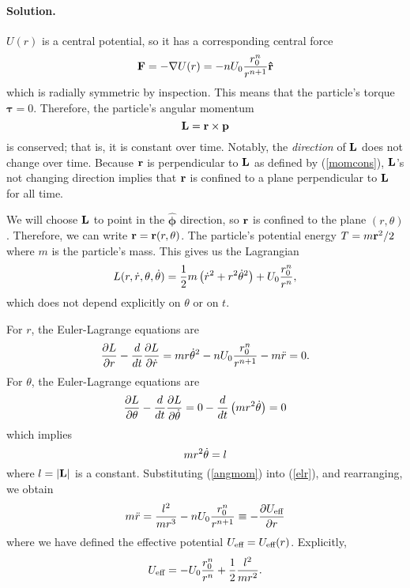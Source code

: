 \documentclass[11pt]{article}
\newcommand{\pder}[2]{\frac{\partial#1}{\partial#2}}
\newcommand{\der}[2]{\frac{d#1}{d#2}}
\newcommand{\refeq}[1]{(\ref{#1})}
\newenvironment{solution}
{
    \paragraph{Solution.}
    \ignorespaces
}
{
    \bigskip\bigskip
}
\begin{document}
\begin{enumerate}
\begin{solution}
		$U(r)$ is a central potential, so it has a corresponding central force
		\begin{equation}
			\mathbf{F} = -\nabla U(r) = -n U_0 \frac{r_0^n}{r^{n+1}} \mathbf{\hat{r}}
		\end{equation}
		which is radially symmetric by inspection.  This means that the particle's torque $\boldsymbol{\tau} = 0$.  Therefore, the particle's angular momentum
		\begin{equation} \label{momcons}
			\mathbf{L} = \mathbf{r} \times \mathbf{p}
		\end{equation}
		is conserved; that is, it is constant over time.  Notably, the \textit{direction} of $\mathbf{L}$ does not change over time.  Because $\mathbf{r}$ is perpendicular to $\mathbf{L}$ as defined by \refeq{momcons}, $\mathbf{L}$'s not changing direction implies that $\mathbf{r}$ is confined to a plane perpendicular to $\mathbf{L}$ for all time.
		
		We will choose $\mathbf{L}$ to point in the $\boldsymbol{\hat{\phi}}$ direction, so $\mathbf{r}$ is confined to the plane $(r, \theta)$.  Therefore, we can write $\mathbf{r} = \mathbf{r}(r, \theta)$.  The particle's potential energy $T = m \mathbf{r}^2 / 2$ where $m$ is the particle's mass.  This gives us the Lagrangian
		\begin{equation}
			L(r, \dot{r}, \theta, \dot{\theta}) = \frac{1}{2} m \left(\dot{r}^2 + r^2 \dot{\theta}^2 \right) + U_0 \frac{r_0^n}{r^n},
		\end{equation}
		which does not depend explicitly on $\theta$ or on $t$.
		
		For $r$, the Euler-Lagrange equations are
		\begin{equation}
			\pder{L}{r} - \der{}{t} \pder{L}{\rd} = m r \thetad^2 - n U_0 \frac{r_0^n}{r^{n+1}} - m \rdd = 0.
		\end{equation}
		For $\theta$, the Euler-Lagrange equations are
		\begin{equation} \label{elr}
			\pder{L}{\theta} - \der{}{t} \pder{L}{\thetad} = 0 - \der{}{t} \left(m r^2 \thetad \right) = 0
		\end{equation}
		which implies
		\begin{equation} \label{angmom}
			m r^2 \dot{\theta} = l
		\end{equation}
		where $l = |\mathbf{L}|$ is a constant.  Substituting \refeq{angmom} into \refeq{elr}, and rearranging, we obtain
		\begin{equation}
			m \rdd = \frac{l^2}{m r^3} - n U_0 \frac{r_0^n}{r^{n+1}} \equiv -\pder{\Ueff}{r}
		\end{equation}
		where we have defined the effective potential $U_\text{eff} = U_\text{eff}(r)$.  Explicitly,
		\begin{equation} \label{ueff}
			U_\text{eff} = -U_0 \frac{r_0^n}{r^n} + \frac{1}{2} \frac{l^2}{mr^2}.
		\end{equation}
		

\end{solution}
\end{enumerate}
\end{document}
